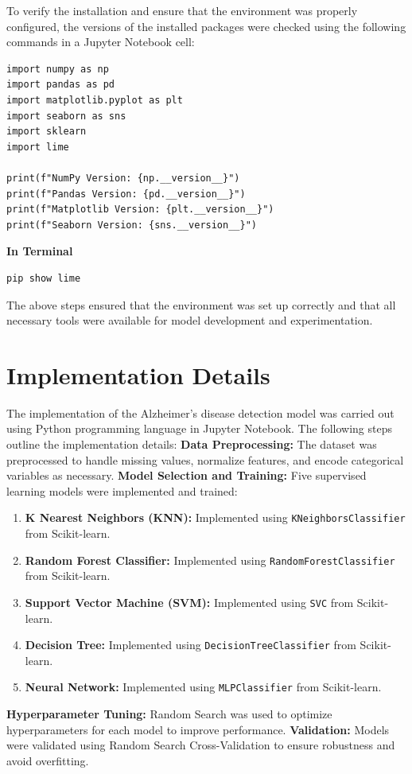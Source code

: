 \documentclass[a4paper,12pt]{report}
\begin{document}
To verify the installation and ensure that the environment was properly configured, the versions of the installed packages were checked using the following commands in a Jupyter Notebook cell:

\begin{verbatim}
import numpy as np
import pandas as pd
import matplotlib.pyplot as plt
import seaborn as sns
import sklearn
import lime

print(f"NumPy Version: {np.__version__}")
print(f"Pandas Version: {pd.__version__}")
print(f"Matplotlib Version: {plt.__version__}")
print(f"Seaborn Version: {sns.__version__}")
\end{verbatim}
\textbf{In Terminal}
\begin{verbatim}
pip show lime
\end{verbatim}
{}
The above steps ensured that the environment was set up correctly and that all necessary tools were available for model development and experimentation.



\section{Implementation Details}

The implementation of the Alzheimer's disease detection model was carried out using Python programming language in Jupyter Notebook. The following steps outline the implementation details:
{}
\newline \textbf{Data Preprocessing:} The dataset was preprocessed to handle missing values, normalize features, and encode categorical variables as necessary.
   {}
 \textbf{Model Selection and Training:} Five supervised learning models were implemented and trained:
    \begin{enumerate}
        \item \textbf{K Nearest Neighbors (KNN):} Implemented using \texttt{KNeighborsClassifier} from Scikit-learn.
        \item \textbf{Random Forest Classifier:} Implemented using \texttt{RandomForestClassifier} from Scikit-learn.
        \item \textbf{Support Vector Machine (SVM):} Implemented using \texttt{SVC} from Scikit-learn.
        \item \textbf{Decision Tree:} Implemented using \texttt{DecisionTreeClassifier} from Scikit-learn.
        \item \textbf{Neural Network:} Implemented using \texttt{MLPClassifier} from Scikit-learn.
    \end{enumerate}
    {}
\textbf{Hyperparameter Tuning:} Random Search was used to optimize hyperparameters for each model to improve performance.
{}
\newline\textbf{Validation:} Models were validated using Random Search Cross-Validation to ensure robustness and avoid overfitting.
\end{document}
